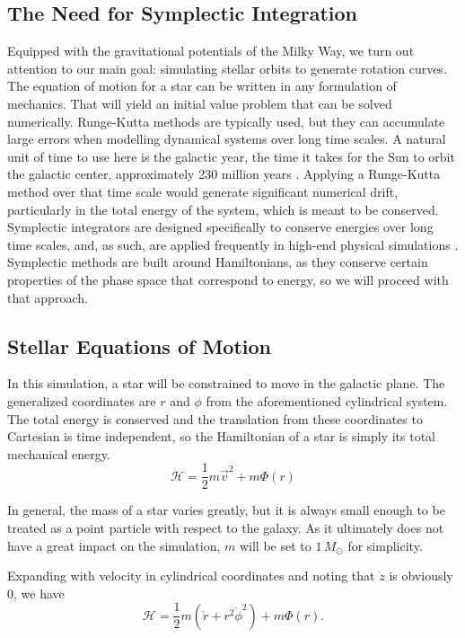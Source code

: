 \documentclass[11pt, twocolumn]{article}
\begin{document}
    \subsection*{The Need for Symplectic Integration}
    Equipped with the gravitational potentials of the Milky Way, we turn out attention to our main goal: simulating stellar orbits to generate rotation curves. The equation of motion for a star can be written in any formulation of mechanics. That will yield an initial value problem that can be solved numerically. Runge-Kutta methods are typically used, but they can accumulate large errors when modelling dynamical systems over long time scales. A natural unit of time to use here is the galactic year, the time it takes for the Sun to orbit the galactic center, approximately 230 million years \parencite{fraknoi_how_2007}. Applying a Runge-Kutta method over that time scale would generate significant numerical drift, particularly in the total energy of the system, which is meant to be conserved. Symplectic integrators are designed specifically to conserve energies over long time scales, and, as such, are applied frequently in high-end physical simulations \parencite{donnelly_symplectic_2005}. Symplectic methods are built around Hamiltonians, as they conserve certain properties of the phase space that correspond to energy, so we will proceed with that approach.

    \subsection*{Stellar Equations of Motion}
    In this simulation, a star will be constrained to move in the galactic plane. The generalized coordinates are $r$ and $\phi$ from the aforementioned cylindrical system. The total energy is conserved and the translation from these coordinates to Cartesian is time independent, so the Hamiltonian of a star is simply its total mechanical energy.
    \begin{equation} \mathcal{H} = \frac{1}{2}m\vec{v}^2+m\Phi (r) \end{equation}

    In general, the mass of a star varies greatly, but it is always small enough to be treated as a point particle with respect to the galaxy. As it ultimately does not have a great impact on the simulation, $m$ will be set to $1 \, \si{M_\odot}$ for simplicity. 

    Expanding with velocity in cylindrical coordinates and noting that $\dot{z}$ is obviously $0$, we have
    \begin{equation} \mathcal{H} = \frac{1}{2}m(\dot{r} + r^2\dot{\phi}^2) + m\Phi (r). \end{equation}
\end{document}
